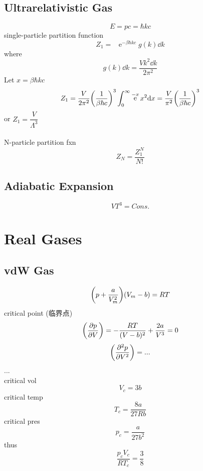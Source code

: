 \documentclass[UTF8]{ctexart} %
\DeclareMathOperator{\intinf}{\int_0^\infty}
\DeclareMathOperator{\e}{\mathrm{e}}
\numberwithin{equation}{subsection}
\begin{document}
\subsection{Ultrarelativistic Gas}
\begin{equation}\label{key}
E = pc = \hbar kc
\end{equation}
single-particle partition function
\begin{equation}\label{key}
Z_1 = \intinf\e^{-\beta\hbar kc}g(k)\dd k
\end{equation}
where
\begin{equation}\label{key}
g(k)\dd k = \dfrac{Vk^2\dd k}{2\pi^2}
\end{equation}
Let $x = \beta\hbar kc$
\begin{equation}\label{key}
Z_1 = \dfrac{V}{2\pi^2}\qty(\dfrac{1}{\beta\hbar c})^3\intinf\e^{-x}x^2\dd x = \dfrac{V}{\pi^2}\qty(\dfrac{1}{\beta\hbar c})^3
\end{equation}
or $Z_1 = \dfrac{V}{\Lambda^3}$\\
~\\
N-particle partition fxn
\begin{equation}\label{key}
Z_N = \dfrac{Z_1^N}{N!}
\end{equation}

\subsection{Adiabatic Expansion}
\begin{equation}\label{key}
VT^3 = Cons.
\end{equation}


\section{Real Gases}
\subsection{vdW Gas}
\begin{equation}\label{key}
\qty(p + \dfrac{a}{V_m^2})(V_m - b) = RT
\end{equation}
critical point (临界点)
\begin{equation}\label{key}
\qty(\pdv{p}{V}) = -\dfrac{RT}{(V - b)^2} + \dfrac{2a}{V^3} = 0
\end{equation}
\begin{equation}\label{key}
\qty(\pdv[2]{p}{V}) = ...
\end{equation}
...\\
critical vol
\begin{equation}\label{key}
V_c = 3b
\end{equation}
critical temp
\begin{equation}\label{key}
T_c = \dfrac{8a}{27Rb}
\end{equation}
critical pres
\begin{equation}\label{key}
p_c = \dfrac{a}{27b^2}
\end{equation}
thus
\begin{equation}\label{key}
\dfrac{p_c V_c}{RT_c} = \dfrac{3}{8}
\end{equation}
\end{document}
